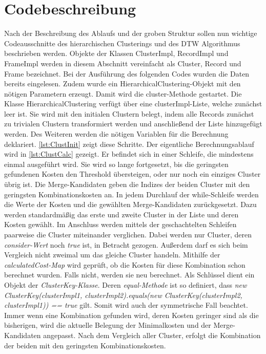 \section{Codebeschreibung}
\label{5-Codebeschreibung}
Nach der Beschreibung des Ablaufs und der groben Struktur
sollen nun wichtige Codeausschnitte des hierarchischen Clusterings
und des \ac{DTW} Algorithmus beschrieben werden.
Objekte der Klassen ClusterImpl, RecordImpl und FrameImpl werden in diesem Abschnitt
vereinfacht als Cluster, Record und Frame bezeichnet.
Bei der Ausführung des folgenden Codes wurden die Daten bereits eingelesen.
Zudem wurde ein HierarchicalClustering-Objekt mit den nötigen Parametern erzeugt.
Damit wird die cluster-Methode gestartet.
Die Klasse HierarchicalClustering verfügt über eine clusterImpl-Liste,
welche zunächst leer ist.
Sie wird mit den initialen Clustern belegt,
indem alle Records zunächst zu trivialen Clustern transformiert werden
und anschließend der Liste hinzugefügt werden.
Des Weiteren werden die nötigen Variablen für die Berechnung deklariert.
\autoref{lst:ClustInit} zeigt diese Schritte.
Der eigentliche Berechnungsablauf wird in \autoref{lst:ClustCalc} gezeigt.
Er befindet sich in einer Schleife, die mindestens einmal ausgeführt wird.
Sie wird so lange fortgesetzt, bis die geringsten gefundenen Kosten den Threshold übersteigen,
oder nur noch ein einziges Cluster übrig ist.
Die Merge-Kandidaten geben die Indizes der beiden Cluster mit den
geringsten Kombinationskosten an.
In jedem Durchlauf der while-Schleife werden die Werte der Kosten
und die gewählten Merge-Kandidaten zurückgesetzt.
Dazu werden standardmäßig das erste und zweite Cluster in der Liste und deren Kosten gewählt.
Im Anschluss werden mittels der geschachtelten Schleifen paarweise die Cluster miteinander verglichen.
Dabei werden nur Cluster, deren \emph{consider-Wert} noch \emph{true} ist, in Betracht gezogen.
Außerdem darf es sich beim Vergleich nicht zweimal um das gleiche Cluster handeln.
Mithilfe der \emph{calculatedCost-Map} wird geprüft, ob die Kosten für diese Kombination schon berechnet wurden.
Falls nicht, werden sie neu berechnet.
Als Schlüssel dient ein Objekt der \emph{ClusterKey-Klasse}.
Deren \emph{equal-Methode} ist so definiert,
dass \emph{new ClusterKey(clusterImpl1, clusterImpl2).equals(new ClusterKey(clusterImpl2, clusterImpl1)) == true} gilt.
Somit wird auch der symmetrische Fall beachtet.
Immer wenn eine Kombination gefunden wird, deren Kosten geringer sind als die bisherigen,
wird die aktuelle Belegung der Minimalkosten und der Merge-Kandidaten angepasst.
Nach dem Vergleich aller Cluster, erfolgt die Kombination der beiden mit den geringsten Kombinationskosten.
